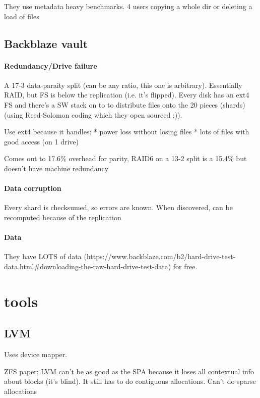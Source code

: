 \documentclass[a4paper]{article}
\begin{document}
        They use metadata heavy benchmarks. 4 users copying a whole dir or
        deleting a load of files

    \subsection{Backblaze vault}
        \paragraph{Redundancy/Drive failure}

        A 17-3 data-paraity split (can be any ratio, this one is arbitrary).
        Essentially RAID, but FS is below the replication (i.e. it's flipped).
        Every disk has an ext4 FS and there's a SW stack on to to distribute
        files onto the 20 pieces (shards) (using Reed-Solomon coding which they
        open sourced ;)).

        Use ext4 because it handles:
        * power loss without losing files
        * lots of files with good access (on 1 drive)

        Comes out to 17.6\% overhead for parity, RAID6 on a 13-2 split is a
        15.4\% but doesn't have machine redundancy

        \paragraph{Data corruption}

        Every shard is checksumed, so errors are known. When discovered, can be
        recomputed because of the replication

        \paragraph{Data}
        They have LOTS of data
        (https://www.backblaze.com/b2/hard-drive-test-data.html#downloading-the-raw-hard-drive-test-data)
        for free.


\section{tools}
    \subsection{LVM}
        Uses device mapper.

        ZFS paper: LVM can't be as good as the SPA because it loses all contextual
        info about blocks (it's blind). It still has to do contiguous allocations.
        Can't do sparse allocations
\end{document}
